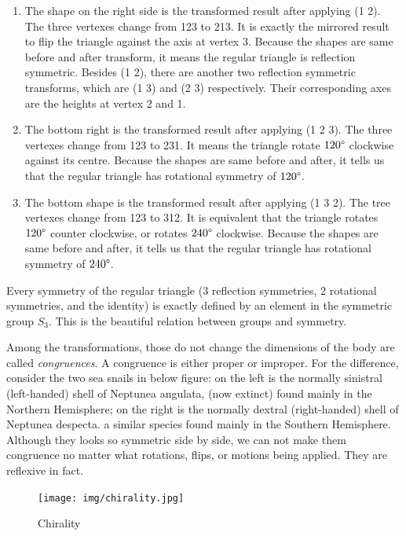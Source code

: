 \documentclass[b5paper]{article}
\begin{document}
\begin{enumerate}
\item The shape on the right side is the transformed result after applying (1 2). The three vertexes change from 123 to 213. It is exactly the mirrored result to flip the triangle against the axis at vertex 3. Because the shapes are same before and after transform, it means the regular triangle is reflection symmetric. Besides (1 2), there are another two reflection symmetric transforms, which are (1 3) and (2 3) respectively. Their corresponding axes are the heights at vertex 2 and 1.

\item The bottom right is the transformed result after applying (1 2 3). The three vertexes change from 123 to 231. It means the triangle rotate $120\degree$ clockwise against its centre. Because the shapes are same before and after, it tells us that the regular triangle has rotational symmetry of $120\degree$.

\item The bottom shape is the transformed result after applying (1 3 2). The tree vertexes change from 123 to 312. It is equivalent that the triangle rotates $120\degree$ counter clockwise, or rotates $240\degree$ clockwise. Because the shapes are same before and after, it tells us that the regular triangle has rotational symmetry of $240\degree$.

\end{enumerate}

Every symmetry of the regular triangle (3 reflection symmetries, 2 rotational symmetries, and the identity) is exactly defined by an element in the symmetric group $S_3$. This is the beautiful relation between groups and symmetry.

Among the transformations, those do not change the dimensions of the body are called {\em congruences}. A congruence is either proper or improper. For the difference, consider the two sea snails in below figure: on the left is the normally sinistral (left-handed) shell of Neptunea angulata, (now extinct) found mainly in the Northern Hemisphere; on the right is the normally dextral (right-handed) shell of Neptunea despecta. a similar species found mainly in the Southern Hemisphere. Although they looks so symmetric side by side, we can not make them congruence no matter what rotations, flips, or motions being applied. They are reflexive in fact.

\begin{figure}[htbp]
 \centering
 \texttt{[image: img/chirality.jpg]}
 \caption{Chirality}
 \label{fig:chirality}
\end{figure}
\end{document}

